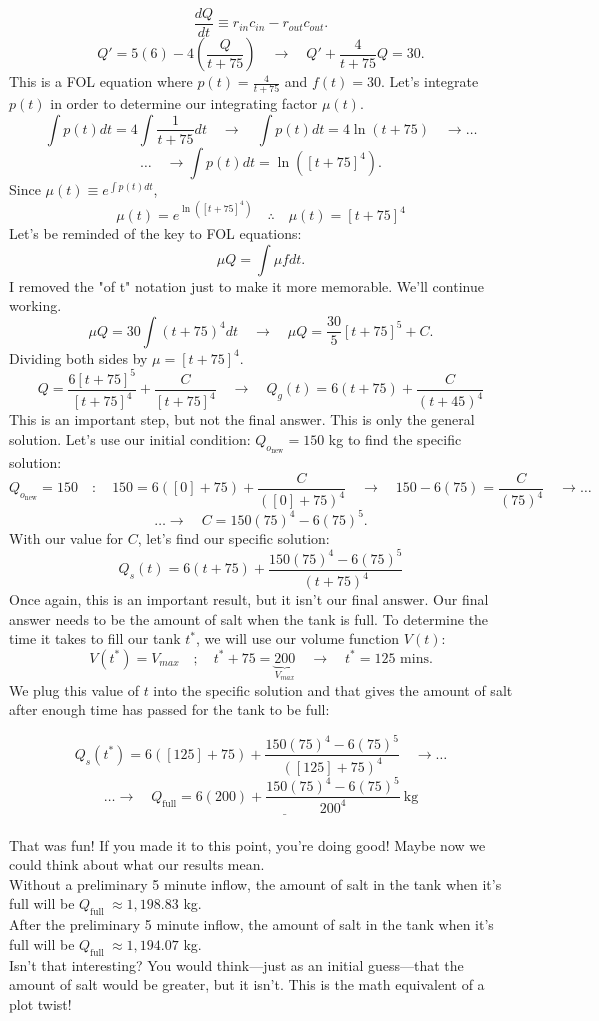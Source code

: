 \documentclass[a4paper,12pt]{article}
\begin{document}
$$ \frac{dQ}{dt} \equiv r_{in}c_{in} - r_{out}c_{out}. $$
$$ Q' = 5(6) - 4\left(\frac{Q}{t + 75}\right) \quad\rightarrow\quad Q' + \frac{4}{t + 75}Q = 30. $$
This is a FOL equation where $p(t) = \frac{4}{t + 75}$ and $f(t) = 30$. Let's integrate $p(t)$ in order to determine our integrating factor $\mu(t)$.
$$ \int p(t) dt = 4\int\frac{1}{t + 75}dt \quad\rightarrow\quad \int p(t)dt = 4\ln{(t + 75)} \quad\rightarrow\ldots  $$
$$ \ldots\quad\rightarrow \int p(t)dt = \ln{([t + 75]^4)}. $$
Since $\mu(t) \equiv e^{\int p(t) dt}$,
$$ \mu(t) = e^{\ln{([t + 75]^4)}} \quad\therefore\quad \mu(t) = [t+75]^4 $$
Let's be reminded of the key to FOL equations:
$$ \mu Q = \int \mu f dt. $$
I removed the "of t" notation just to make it more memorable. We'll continue working.
$$ \mu Q = 30\int(t + 75)^4dt  \quad\rightarrow\quad \mu Q = \frac{30}{5}\left[t + 75\right]^5 + C. $$
Dividing both sides by $\mu = [t + 75]^4$.
$$ Q = \frac{6[t+75]^5}{[t+75]^4} + \frac{C}{[t + 75]^4} \quad\rightarrow\quad \boxed{Q_g(t) = 6(t+75) + \frac{C}{(t + 45)^4}} $$
This is an important step, but not the final answer. This is only the general solution. Let's use our initial condition: $Q_{o_{\text{new}}}=150$ kg to find the specific solution:
$$ Q_{o_{\text{new}}}=150 \quad:\quad 150 = 6([0] + 75) + \frac{C}{([0] + 75)^4} \quad\rightarrow\quad 150 - 6(75) = \frac{C}{(75)^4} \quad\rightarrow\ldots$$
$$ \ldots\rightarrow\quad C = 150(75)^4 - 6(75)^5. $$
With our value for $C$, let's find our specific solution:
$$ \boxed{Q_{s}(t) = 6(t + 75) + \frac{150(75)^4 - 6(75)^5}{(t + 75)^4}} $$
Once again, this is an important result, but it isn't our final answer. Our final answer needs to be the amount of salt when the tank is full. To determine the time it takes to fill our tank $t^*$, we will use our volume function $V(t)$:
$$
 V\left(t^*\right)=V_{max} \quad ; \quad t^*+75=\underbrace{200}_{V_{max}} \quad \rightarrow \quad t^*=125 \text { mins} . 
 $$
 We plug this value of $t$ into the specific solution and that gives the amount of salt after enough time has passed for the tank to be full:
 
 $$ Q_s(t^*) = 6([125] + 75) + \frac{150(75)^4 - 6(75)^5}{([125] + 75)^4} \quad\rightarrow\ldots $$
 $$ \ldots\rightarrow\quad \underline{\boxed{Q_{\text{full}} = 6(200) + \frac{150(75)^4 - 6(75)^5}{200^4} \mathrm{~kg}}} $$\\

That was fun! If you made it to this point, you're doing good! Maybe now we could think about what our results mean.\\

Without a preliminary 5 minute inflow, the amount of salt in the tank when it's full will be $Q_{\text{full }}$$\approx 1,198.83$ kg.\\

After the preliminary 5 minute inflow, the amount of salt in the tank when it's full will be $Q_{\text{full }}$$\approx 1,194.07$ kg.\\

Isn't that interesting? You would think---just as an initial guess---that the amount of salt would be greater, but it isn't. This is the math equivalent of a plot twist!
\end{document}
